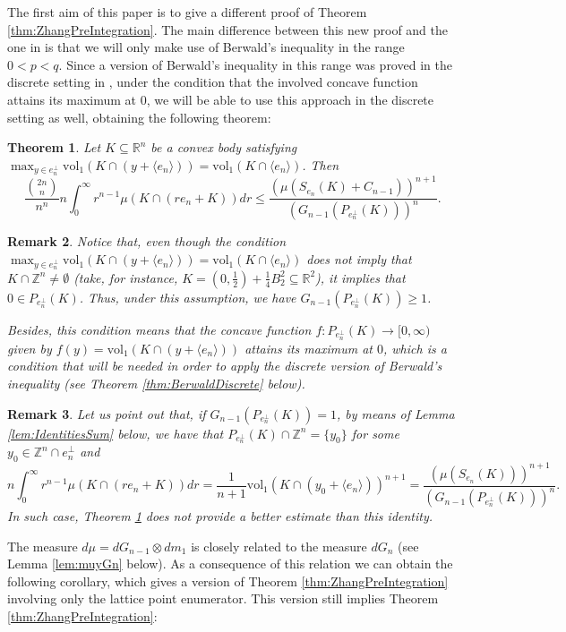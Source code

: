 \documentclass[10pt]{amsart}
\newtheorem{thm}{Theorem}[section]
\newtheorem{rmk}[thm]{Remark}
\def\R{\mathbb{R}}
\def\Z{\mathbb{Z}}
\def\vol{\mathrm{vol}}
\numberwithin{equation}{section}
\begin{document}
The first aim of this paper is to give a different proof of Theorem \ref{thm:ZhangPreIntegration}. The main difference between this new proof and the one in \cite{GZ} is that we will only make use of Berwald's inequality in the range $0<p<q$. Since a version of Berwald's inequality in this range was proved in the discrete setting in \cite{ALY}, under the condition that the involved concave function attains its maximum at $0$, we will be able to use this approach in the discrete setting as well, obtaining the following theorem:

\begin{thm}\label{thm:DiscreteZhangPreIntegration}
Let $K\subseteq\R^n$ be a convex body satisfying $\displaystyle{\max_{y\in e_n^\perp}\vol_1(K\cap(y+\langle e_n\rangle))}=\vol_1(K\cap\langle e_n\rangle)$.  Then
$$
\frac{{{2n}\choose{n}}}{n^n}n\int_0^\infty r^{n-1}\mu(K\cap(re_n+K))dr\leq\frac{(\mu(S_{e_n}(K)+C_{n-1}))^{n+1}}{(G_{n-1}(P_{e_n^\perp}(K)))^n}.
$$
\end{thm}

\begin{rmk}
Notice that, even though the condition $\displaystyle{\max_{y\in e_n^\perp}\vol_1(K\cap(y+\langle e_n\rangle))}=\vol_1(K\cap\langle e_n\rangle)$ does not imply that $K\cap\Z^n\neq\emptyset$ (take, for instance, $K=\left(0,\frac{1}{2}\right)+\frac{1}{4}B_2^2\subseteq\R^2$), it implies that $0\in P_{e_n^\perp}(K)$. Thus, under this assumption, we have $G_{n-1}(P_{e_n^\perp}(K))\geq1$.

Besides, this condition means that the concave function $f:P_{e_n^\perp}(K)\to[0,\infty)$ given by $f(y)=\vol_1(K\cap(y+\langle e_n\rangle))$ attains its maximum at $0$, which is a condition that will be needed in order to apply the discrete version of Berwald's inequality (see Theorem \ref{thm:BerwaldDiscrete} below).
\end{rmk}

\begin{rmk}
Let us point out that, if $G_{n-1}(P_{e_n^\perp}(K))=1$, by means of Lemma \ref{lem:IdentitiesSum} below, we have that $P_{e_n^\perp}(K)\cap\Z^n=\{y_0\}$ for some $y_0\in\Z^n\cap e_n^\perp$ and
$$
n\int_0^\infty r^{n-1}\mu(K\cap(re_n+K))dr=\frac{1}{n+1}\vol_1(K\cap(y_0+\langle e_n\rangle))^{n+1}=\frac{(\mu(S_{e_n}(K)))^{n+1}}{(G_{n-1}(P_{e_n^\perp}(K)))^n}.
$$
In such case, Theorem \ref{thm:DiscreteZhangPreIntegration} does not provide a better estimate than this identity.
\end{rmk}

The measure $d\mu=d G_{n-1}\otimes dm_1$ is closely related to the measure $dG_n$ (see Lemma \ref{lem:muyGn} below). As a consequence of this relation we can obtain the following corollary, which gives a version of Theorem \ref{thm:ZhangPreIntegration} involving only the lattice point enumerator. This version still implies Theorem \ref{thm:ZhangPreIntegration}:
\end{document}
